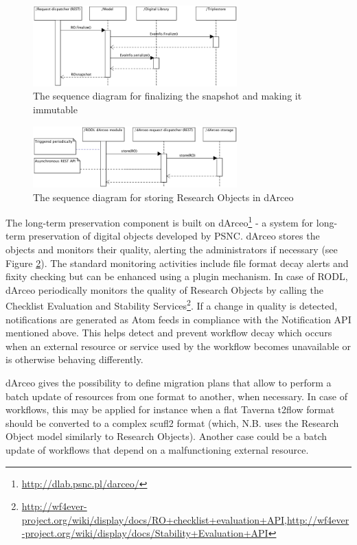 \begin{figure}[!h]
\centering
\includegraphics[width=0.7\textwidth]{Figures/RODL/SnapshotFinalize.png}
\caption{The sequence diagram for finalizing the snapshot and making it immutable}
\label{SnapshotFinalize}
\end{figure}

\begin{figure}[!h]
\centering
\includegraphics[width=0.7\textwidth]{Figures/RODL/dArceoStore.png}
\caption{The sequence diagram for storing Research Objects in dArceo}
\label{dArceoStore}
\end{figure}

The long-term preservation component is built on dArceo\footnote{\url{http://dlab.psnc.pl/darceo/}} - a system for long-term preservation of digital objects developed by PSNC. dArceo stores the objects and monitors their quality, alerting the administrators if necessary (see Figure \ref{dArceoStore}). The standard monitoring activities include file format decay alerts and fixity checking but can be enhanced using a plugin mechanism. In case of RODL, dArceo periodically monitors the quality of Research Objects by calling the Checklist Evaluation and Stability Services\footnote{\url{http://wf4ever-project.org/wiki/display/docs/RO+checklist+evaluation+API},\url{http://wf4ever-project.org/wiki/display/docs/Stability+Evaluation+API}}. If a change in quality is detected, notifications are generated as Atom feeds in compliance with the Notification API mentioned above. This helps detect and prevent workflow decay which occurs when an external resource or service used by the workflow becomes unavailable or is otherwise behaving differently.

dArceo gives the possibility to define migration plans that allow to perform a batch update of resources from one format to another, when necessary. In case of workflows, this may be applied for instance when a flat Taverna t2flow format should be converted to a complex scufl2 format (which, N.B. uses the Research Object model similarly to Research Objects). Another case could be a batch update of workflows that depend on a malfunctioning external resource.

